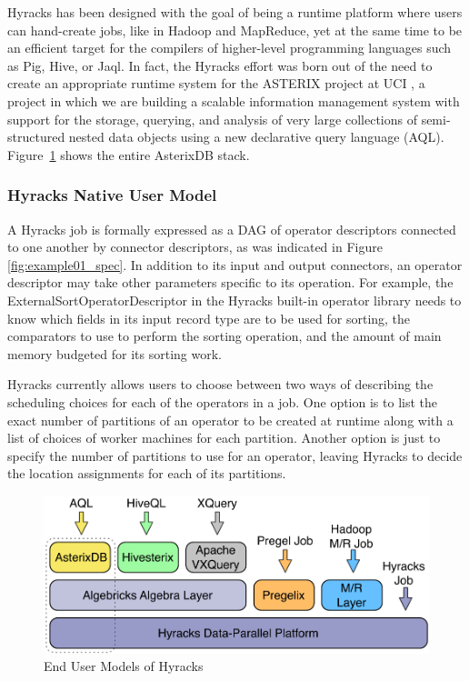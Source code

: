 Hyracks has been designed with the goal of being a runtime platform
where users can hand-create jobs, like in Hadoop and MapReduce, yet at
the same time to be an efficient target for the compilers of
higher-level programming languages such as Pig, Hive, or Jaql. In
fact, the Hyracks effort was born out of the need to create an
appropriate runtime system for the ASTERIX project at UCI
\cite{asterix:website}, a project in which we are building a scalable
information management system with support for the storage, querying,
and analysis of very large collections of semi-structured nested data
objects using a new declarative query language (AQL).
Figure~\ref{fig:enduser} shows the entire AsterixDB stack.

\subsubsection{Hyracks Native User Model}

A Hyracks job is formally expressed as a DAG of operator descriptors
connected to one another by connector descriptors, as was indicated in
Figure \ref{fig:example01_spec}.  In addition to its input and output
connectors, an operator descriptor may take other parameters specific
to its operation.  For example, the ExternalSortOperatorDescriptor in
the Hyracks built-in operator library needs to know which fields in
its input record type are to be used for sorting, the comparators to
use to perform the sorting operation, and the amount of main memory
budgeted for its sorting work.

Hyracks currently allows users to choose between two ways of
describing the scheduling choices for each of the operators in a job.
One option is to list the exact number of partitions of an operator to
be created at runtime along with a list of choices of worker machines
for each partition.  Another option is just to specify the number of
partitions to use for an operator, leaving Hyracks to decide the
location assignments for each of its partitions.

\begin{figure} [htb!]
  \centering
  \includegraphics[width=6in]{images/asterixdb_stack}
  \caption{End User Models of Hyracks}
  \label{fig:enduser}
\end{figure}


